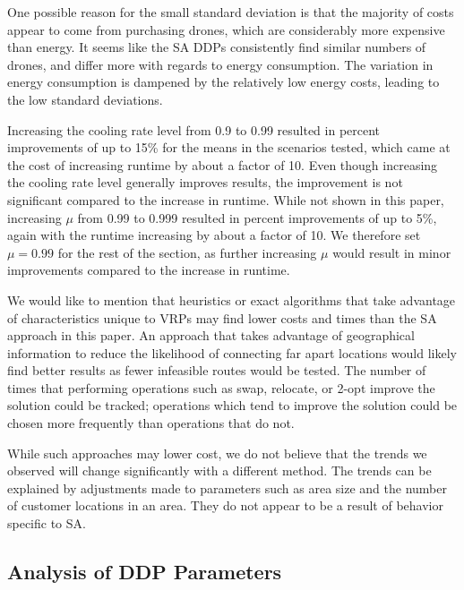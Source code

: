\documentclass[journal]{IEEEtran}
\begin{document}
One possible reason for the small standard deviation is that the majority of costs appear to come from purchasing drones, which are considerably more expensive than energy. It seems like the SA DDPs consistently find similar numbers of drones, and differ more with regards to energy consumption. The variation in energy consumption is dampened by the relatively low energy costs, leading to the low standard deviations.

Increasing the cooling rate level from 0.9 to 0.99 resulted in percent improvements of up to 15\% for the means in the scenarios tested, which came at the cost of increasing runtime by about a factor of 10. Even though increasing the cooling rate level generally improves results, the improvement is not significant compared to the increase in runtime. While not shown in this paper, increasing ${\ensuremath{\mu}}$ from 0.99 to 0.999 resulted in percent improvements of up to 5\%, again with the runtime increasing by about a factor of 10. We therefore set ${\ensuremath{\mu}}=0.99$ for the rest of the section, as further increasing ${\ensuremath{\mu}}$ would result in minor improvements compared to the increase in runtime.

We would like to mention that heuristics or exact algorithms that take advantage of characteristics unique to VRPs may find lower costs and times than the SA approach in this paper. An approach that takes advantage of geographical information to reduce the likelihood of connecting far apart locations would likely find better results as fewer infeasible routes would be tested. The number of times that performing operations such as swap, relocate, or 2-opt improve the solution could be tracked; operations which tend to improve the solution could be chosen more frequently than operations that do not.

While such approaches may lower cost, we do not believe that the trends we observed will change significantly with a different method. The trends can be explained by adjustments made to parameters such as area size and the number of customer locations in an area. They do not appear to be a result of behavior specific to SA.

\subsection{Analysis of DDP Parameters}
\label{ssec:limiting-budget-delivery-time}
\end{document}
